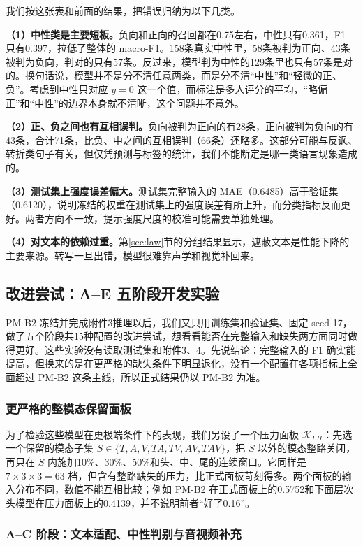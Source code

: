 我们按这张表和前面的结果，把错误归纳为以下几类。

\textbf{（1）中性类是主要短板。}负向和正向的召回都在0.75左右，中性只有0.361，F1 只有0.397，拉低了整体的 macro-F1。158条真实中性里，58条被判为正向、43条被判为负向，判对的只有57条。反过来，模型判为中性的129条里也只有57条是对的。换句话说，模型并不是分不清任意两类，而是分不清“中性”和“轻微的正、负”。考虑到中性只对应 $y=0$ 这一个值，而标注是多人评分的平均，“略偏正”和“中性”的边界本身就不清晰，这个问题并不意外。

\textbf{（2）正、负之间也有互相误判。}负向被判为正向的有28条，正向被判为负向的有43条，合计71条，比负、中之间的互相误判（66条）还略多。这部分可能与反讽、转折类句子有关，但仅凭预测与标签的统计，我们不能断定是哪一类语言现象造成的。

\textbf{（3）测试集上强度误差偏大。}测试集完整输入的 MAE（0.6485）高于验证集（0.6120），说明冻结的权重在测试集上的强度误差有所上升，而分类指标反而更好。两者方向不一致，提示强度尺度的校准可能需要单独处理。

\textbf{（4）对文本的依赖过重。}第\ref{sec:law}节的分组结果显示，遮蔽文本是性能下降的主要来源。转写一旦出错，模型很难靠声学和视觉补回来。

\subsection{改进尝试：A–E 五阶段开发实验}\label{sec:ae}

PM-B2 冻结并完成附件3推理以后，我们又只用训练集和验证集、固定 seed 17，做了五个阶段共15种配置的改进尝试，想看看能否在完整输入和缺失两方面同时做得更好。这些实验没有读取测试集和附件3、4。先说结论：完整输入的 F1 确实能提高，但换来的是在更严格的缺失条件下明显退化，没有一个配置在各项指标上全面超过 PM-B2 这条主线，所以正式结果仍以 PM-B2 为准。

\subsubsection{更严格的整模态保留面板}

为了检验这些模型在更极端条件下的表现，我们另设了一个压力面板 $\mathcal{K}_{LH}$：先选一个保留的模态子集 $S\in\{T,A,V,TA,TV,AV,TAV\}$，把 $S$ 以外的模态整路关闭，再只在 $S$ 内施加10\%、30\%、50\%和头、中、尾的连续窗口。它同样是 $7\times3\times3=63$ 档，但含有整路缺失的压力，比正式面板苛刻得多。两个面板的输入分布不同，数值不能互相比较；例如 PM-B2 在正式面板上的0.5752和下面层次头模型在压力面板上的0.4139，并不说明前者“好了0.16”。

\subsubsection{A–C 阶段：文本适配、中性判别与音视频补充}

